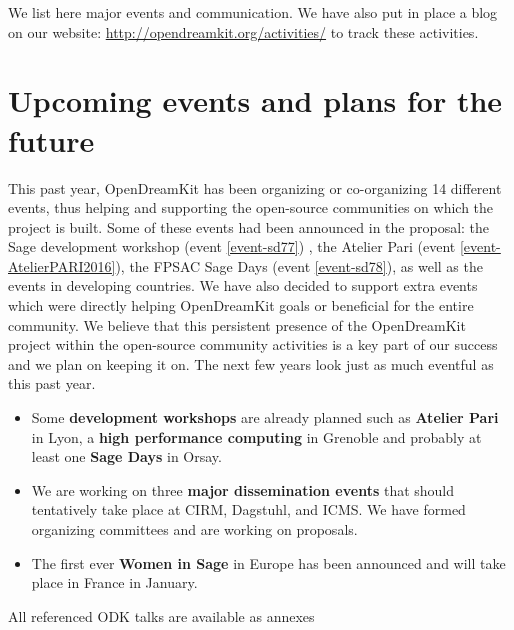 \documentclass{deliverablereport}
\begin{document}
We list here major events and communication. We have also put in place
a blog on our website: \url{http://opendreamkit.org/activities/} to track
these activities.
















\section{Upcoming events and plans for the future}

This past year, OpenDreamKit has been organizing or co-organizing
14 different events, thus helping and supporting the open-source
communities on which the project is built. Some of these events had
been announced in the proposal: the Sage development workshop (event \ref{event-sd77}) , the Atelier
Pari (event \ref{event-AtelierPARI2016}), the FPSAC Sage Days (event \ref{event-sd78}), as
well as the events in developing countries. We have also decided
to support extra events which were directly helping OpenDreamKit goals
or beneficial for the entire community. 
We believe that this persistent presence of the OpenDreamKit project within
the open-source community activities is a key part of our success 
and we plan on keeping it on. The next few years look just as much eventful
as this past year. 

\begin{itemize}
\item Some \textbf{development workshops} are already planned such as \textbf{Atelier Pari} in Lyon,
a \textbf{high performance computing} in Grenoble and probably at least one \textbf{Sage Days} in Orsay.

\item We are working on three \textbf{major dissemination events} that should tentatively take place
at CIRM, Dagstuhl, and ICMS. We have formed organizing committees and are working on proposals.

\item The first ever \textbf{Women in Sage} in Europe has been announced and will take place
in France in January.
\end{itemize}




\footnotesize{All referenced ODK talks are available as annexes}
\end{document}
